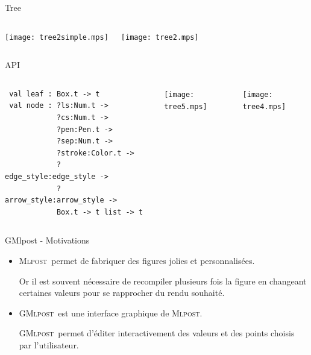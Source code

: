 \documentclass{beamer}
\newcommand{\mlpost}{\textsc{Mlpost}}
\newcommand{\gmlpost}{\textsc{GMlpost}}
\begin{document}
\begin{frame}{Tree}
  \begin{columns}
    \begin{center}
      \texttt{[image: tree2simple.mps]}
    \end{center}
    \begin{center}
      \texttt{[image: tree2.mps]}
    \end{center}
  \end{columns}
\end{frame}

\begin{frame}[fragile]{API}
  \begin{columns}
  \begin{verbatim}
 val leaf : Box.t -> t
 val node : ?ls:Num.t -> 
            ?cs:Num.t -> 
            ?pen:Pen.t -> 
            ?sep:Num.t ->
            ?stroke:Color.t -> 
            ?edge_style:edge_style -> 
            ?arrow_style:arrow_style -> 
            Box.t -> t list -> t
  \end{verbatim}
    \texttt{[image: tree5.mps]}

    \bigskip
    \bigskip
    \texttt{[image: tree4.mps]}
    \end{columns}
\end{frame}

\begin{frame}{GMlpost - Motivations}
  \begin{itemize}
  \item<1-> \mlpost\ permet de fabriquer des figures jolies et personnalisées.
  
  \bigskip
  
  Or il est souvent nécessaire de recompiler plusieurs fois la figure en changeant certaines valeurs pour se rapprocher du rendu souhaité. 

\bigskip

  \item<2->  \gmlpost\ est une interface graphique de \mlpost.

    \bigskip

    \gmlpost\ permet d'éditer interactivement des valeurs et des points choisis par l'utilisateur.

  \end{itemize}
\end{frame}
\end{document}
